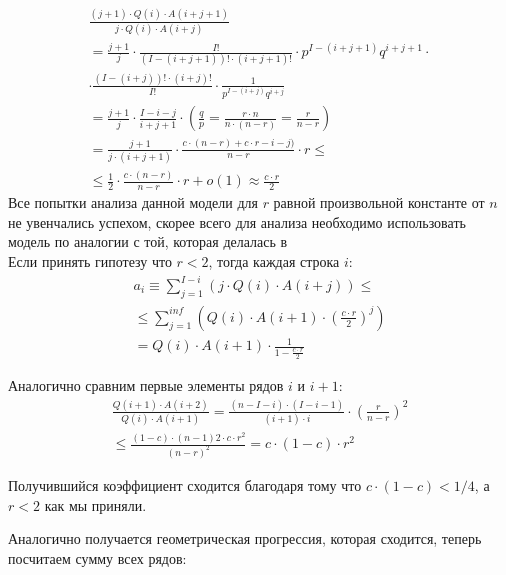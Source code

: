 \documentclass[times,specification,annotation]{itmo-student-thesis}
\begin{document}
    \begin{gather*}
        \frac{(j + 1)\cdot Q(i)\cdot A(i + j + 1)}{j\cdot Q(i) \cdot A(i + j)} \\
        = \frac{j + 1}{j} \cdot \frac{I!}{(I - (i + j + 1))! \cdot (i + j + 1)!} \cdot p^{I - (i + j + 1)} q^{i + j + 1} \cdot\\
        \cdot \frac{(I - (i + j))! \cdot (i + j)!} {I!} \cdot \frac{1}{p^{I - (i + j)} q^{i + j}} \\
        = \frac{j + 1}{j} \cdot \frac{I - i - j}{i + j + 1} \cdot (\frac{q}{p} = \frac{r \cdot n}{n \cdot (n - r)} = \frac{r}{n - r}) \\
        =  \frac{j + 1}{j \cdot (i + j + 1)} \cdot  \frac{c\cdot (n - r) + c\cdot r - i - j)}{n - r} \cdot r \leq \\
        \leq \frac{1}{2} \cdot \frac{c\cdot (n - r)}{n - r} \cdot r + o(1) \approx \frac{c \cdot r}{2}
    \end{gather*}
    Все попытки анализа данной модели для $r$ равной произвольной константе от $n$ не увенчались успехом, скорее всего для анализа необходимо использовать модель по аналогии с той, которая делалась в \cite{markov_chain} \\
    Если принять гипотезу что $r < 2$, тогда каждая строка $i$: \\
    \begin{gather*}
        a_i \equiv \sum_{j = 1}^{I - i} (j \cdot Q(i) \cdot A(i + j)) \leq \\
        \leq \sum_{j = 1}^{inf} (Q(i) \cdot A(i + 1) \cdot (\frac{c \cdot r}{2})^{j}) \\
        = Q(i) \cdot A(i + 1) \cdot \frac{1}{1 - \frac{c \cdot r}{2}}
    \end{gather*}

    Аналогично сравним первые элементы рядов $i$ и $i + 1$:
    \begin{gather*}
        \frac{Q(i + 1) \cdot A(i + 2)}{Q(i) \cdot A(i + 1)} = \frac{(n - I - i) \cdot (I - i - 1)}{(i + 1) \cdot i} \cdot (\frac{r}{n - r})^2 \\
        \leq \frac{(1 - c) \cdot (n - 1)2 \cdot c \cdot r^2}{(n - r)^2} = c \cdot (1 - c) \cdot r^2
    \end{gather*}

    Получившийся коэффициент сходится благодаря тому что $c \cdot (1 - c) < 1/4$, а $r < 2$ как мы приняли.

    Аналогично получается геометрическая прогрессия, которая сходится, теперь посчитаем сумму всех рядов:
\end{document}
